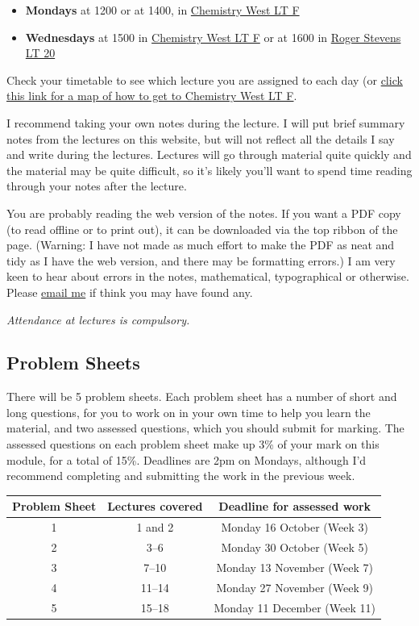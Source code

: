 \documentclass[
  a4paper,
]{book}
\providecommand{\tightlist}{%
  \setlength{\itemsep}{0pt}\setlength{\parskip}{0pt}}
\theoremstyle{definition}
\theoremstyle{definition}
\theoremstyle{definition}
\theoremstyle{definition}
\theoremstyle{remark}
\begin{document}
\begin{itemize}
\tightlist
\item
  \textbf{Mondays} at 1200 or at 1400, in \href{chem-west-map.png}{Chemistry West LT F}
\item
  \textbf{Wednesdays} at 1500 in \href{chem-west-map.png}{Chemistry West LT F} or at 1600 in \href{https://students.leeds.ac.uk/rooms?type=room\&id=100044}{Roger Stevens LT 20}
\end{itemize}

Check your timetable to see which lecture you are assigned to each day (or \href{(chem-west-map.png)}{click this link for a map of how to get to Chemistry West LT F}.

I recommend taking your own notes during the lecture. I will put brief summary notes from the lectures on this website, but will not reflect all the details I say and write during the lectures. Lectures will go through material quite quickly and the material may be quite difficult, so it's likely you'll want to spend time reading through your notes after the lecture.

You are probably reading the web version of the notes. If you want a PDF copy (to read offline or to print out), it can be downloaded via the top ribbon of the page. (Warning: I have not made as much effort to make the PDF as neat and tidy as I have the web version, and there may be formatting errors.) I am very keen to hear about errors in the notes, mathematical, typographical or otherwise. Please \href{mailto:m.aldridge@leeds.ac.uk}{email me} if think you may have found any.

\emph{Attendance at lectures is compulsory.}

\hypertarget{problem-sheets}{%
\subsection*{Problem Sheets}\label{problem-sheets}}

There will be 5 problem sheets. Each problem sheet has a number of short and long questions, for you to work on in your own time to help you learn the material, and two assessed questions, which you should submit for marking. The assessed questions on each problem sheet make up 3\% of your mark on this module, for a total of 15\%. Deadlines are 2pm on Mondays, although I'd recommend completing and submitting the work in the previous week.

\begin{longtable}[]{@{}ccc@{}}
\toprule()
Problem Sheet & Lectures covered & Deadline for assessed work \\
\midrule()
\endhead
1 & 1 and 2 & Monday 16 October (Week 3) \\
2 & 3--6 & Monday 30 October (Week 5) \\
3 & 7--10 & Monday 13 November (Week 7) \\
4 & 11--14 & Monday 27 November (Week 9) \\
5 & 15--18 & Monday 11 December (Week 11) \\
\bottomrule()
\end{longtable}
\end{document}
